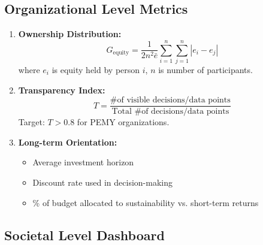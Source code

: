 \documentclass[11pt,a4paper]{article}
\theoremstyle{definition}
\theoremstyle{remark}
\begin{document}
\subsection{Organizational Level Metrics}

\begin{enumerate}[leftmargin=1.5em]
    \item \textbf{Ownership Distribution:}
    \[
    G_{\text{equity}} = \frac{1}{2n^2\bar{e}}\sum_{i=1}^n\sum_{j=1}^n |e_i - e_j|
    \]
    where $e_i$ is equity held by person $i$, $n$ is number of participants.
    
    \item \textbf{Transparency Index:}
    \[
    T = \frac{\text{\# of visible decisions/data points}}{\text{Total \# of decisions/data points}}
    \]
    Target: $T > 0.8$ for PEMY organizations.
    
    \item \textbf{Long-term Orientation:}
    \begin{itemize}
        \item Average investment horizon
        \item Discount rate used in decision-making
        \item \% of budget allocated to sustainability vs. short-term returns
    \end{itemize}
\end{enumerate}

\subsection{Societal Level Dashboard}
\end{document}
